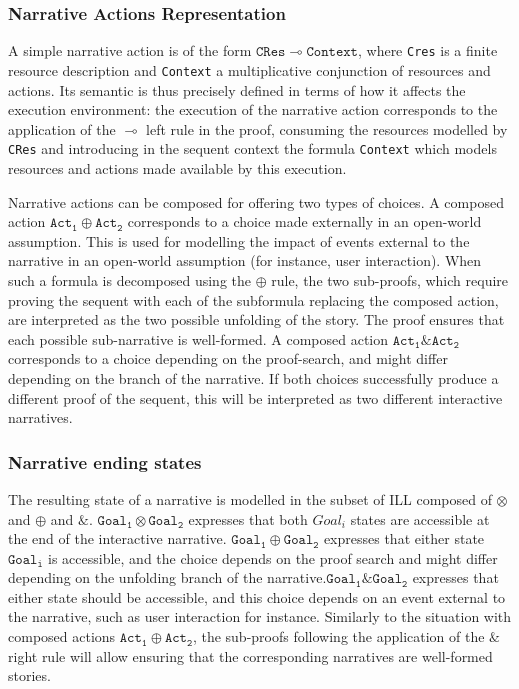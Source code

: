 \documentclass[runningheads,a4paper]{llncs}
\begin{document}
\subsubsection{Narrative Actions Representation}
A simple narrative action is of the form $\mathtt{CRes} \multimap \mathtt{Context}$, where \texttt{Cres} is a finite resource description and \texttt{Context} a multiplicative conjunction of resources and actions. Its semantic is thus precisely defined in terms of how it affects the execution environment: the execution of the narrative action corresponds to the application of the $\multimap$ left rule in the proof, consuming the resources modelled by \texttt{CRes} and introducing in the sequent context the formula \texttt{Context} which models resources and actions made available by this execution.

Narrative actions can be composed for offering two types of choices. A composed action $\mathtt{Act_{1}} \oplus \mathtt{Act_{2}}$ corresponds to a choice made externally in an open-world assumption. This is used for modelling the impact of events external to the narrative in an open-world assumption (for instance, user interaction). When such a formula is decomposed using the $\oplus$ rule, the two sub-proofs, which require proving the sequent with each of the subformula replacing the composed action, are interpreted as the two possible unfolding of the story. The proof ensures that each possible sub-narrative is well-formed. A composed action $\mathtt{Act_{1}} \& \mathtt{Act_{2}}$ corresponds to a choice depending on the proof-search, and might differ depending on the branch of the narrative. If both choices successfully produce a different proof of the sequent, this will be interpreted as two different interactive narratives.
\subsubsection{Narrative ending states}
The resulting state of a narrative is modelled in the subset of ILL composed of $\otimes$ and $\oplus$ and $\&$. 
$\mathtt{Goal_{1}} \otimes \mathtt{Goal_{2}}$ expresses that both $Goal_{i}$ states are accessible at the end of the interactive narrative. $\mathtt{Goal_{1}} \oplus \mathtt{Goal_{2}}$ expresses that either state $\mathtt{Goal_{i}}$ is accessible, and the choice depends on the proof search and might differ depending on the unfolding branch of the narrative.$\mathtt{Goal_{1}} \& \mathtt{Goal_{2}}$ expresses that either state should be accessible, and this choice depends on an event external to the narrative, such as user interaction for instance. Similarly to the situation with composed actions $\mathtt{Act_1}\oplus\mathtt{Act_2}$, the sub-proofs following the application of the $\&$ right rule will allow ensuring that the corresponding narratives are well-formed stories.
\end{document}
